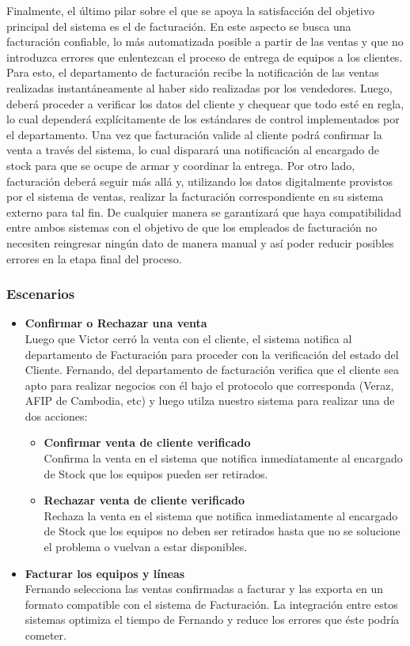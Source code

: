 Finalmente, el último pilar sobre el que se apoya la satisfacción del objetivo principal del sistema es el de facturación. En este aspecto se busca una facturación confiable, lo más automatizada posible a partir de las ventas y que no introduzca errores que enlentezcan el proceso de entrega de equipos a los clientes. Para esto, el departamento de facturación recibe la notificación de las ventas realizadas instantáneamente al haber sido realizadas por los vendedores. Luego, deberá proceder a verificar los datos del cliente y chequear que todo esté en regla, lo cual dependerá explícitamente de los estándares de control implementados por el departamento. Una vez que facturación valide al cliente podrá confirmar la venta a través del sistema, lo cual disparará una notificación al encargado de stock para que se ocupe de armar y coordinar la entrega. Por otro lado, facturación deberá seguir más allá y, utilizando los datos digitalmente provistos por el sistema de ventas, realizar la facturación correspondiente en su sistema externo para tal fin. De cualquier manera se garantizará que haya compatibilidad entre ambos sistemas con el objetivo de que los empleados de facturación no necesiten reingresar ningún dato de manera manual y así poder reducir posibles errores en la etapa final del proceso.

\subsubsection{Escenarios}

\begin{itemize}
  \item \textbf{Confirmar o Rechazar una venta} \\
    Luego que Victor cerró la venta con el cliente, el sistema notifica al departamento de Facturación para proceder con la verificación del estado del Cliente. 
    Fernando, del departamento de facturación verifica que el cliente sea apto 
    para realizar negocios con él bajo el protocolo que corresponda (Veraz, AFIP de Cambodia, etc) 
    y luego utilza nuestro sistema para realizar una de dos acciones:
  \begin{itemize}
    \item \textbf{Confirmar venta de cliente verificado} \\
      Confirma la venta en el sistema que notifica inmediatamente al encargado de Stock que los equipos pueden ser retirados.
    \item \textbf{Rechazar venta de cliente verificado} \\
      Rechaza la venta en el sistema que notifica inmediatamente al encargado de Stock que los equipos no deben ser retirados hasta que no se solucione el problema o vuelvan a estar disponibles.
  \end{itemize}

  \item \textbf{Facturar los equipos y líneas} \\
    Fernando selecciona las ventas confirmadas a facturar y las exporta en un formato compatible con el sistema de Facturación. La integración entre estos sistemas optimiza el tiempo de Fernando y reduce los errores que éste podría cometer.
\end{itemize}

